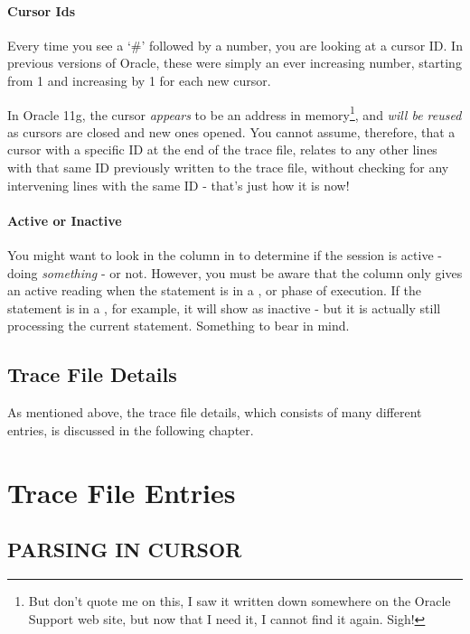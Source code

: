 \subsubsection{Cursor Ids}\label{cursor-ids}

Every time you see a `\#' followed by a number, you are looking at a cursor ID. In previous versions of Oracle, these were simply an ever increasing number, starting from 1 and increasing by 1 for each new cursor.

In Oracle 11g, the cursor \emph{appears} to be an address in memory\footnote{But don't quote me on this, I saw it written down somewhere on the Oracle Support web site, but now that I need it, I cannot find it again. Sigh!}, and \emph{will be reused} as cursors are closed and new ones opened. You cannot assume, therefore, that a cursor with a specific ID at the end of the trace file, relates to any other lines with that same ID previously written to the trace file, without checking for any intervening  lines with the same ID - that's just how it is now!

\subsubsection{Active or Inactive}\label{active-or-inactive}

You might want to look in the  column in  to determine if the session is active - doing \emph{something} - or not. However, you must be aware that the  column only gives an active reading when the statement is in a ,  or  phase of execution. If the statement is in a , for example, it will show as inactive - but it is actually still processing the current statement. Something to bear in mind.

\section{Trace File Details}\label{trace-file-details}

As mentioned above, the trace file details, which consists of many different entries, is discussed in the following chapter.

\chapter{Trace File Entries}

\section{PARSING IN CURSOR}\label{parsing-in-cursor}

